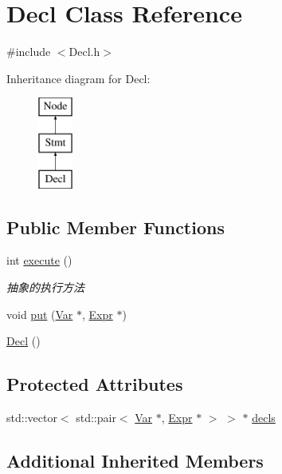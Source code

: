 \hypertarget{class_decl}{}\section{Decl Class Reference}
\label{class_decl}


{\ttfamily \#include $<$Decl.\+h$>$}

Inheritance diagram for Decl\+:\begin{figure}[H]
\begin{center}
\leavevmode
\includegraphics[height=3.000000cm]{class_decl}
\end{center}
\end{figure}
\subsection*{Public Member Functions}
\begin{DoxyCompactItemize}
\item 
int \hyperlink{class_decl_ad6495a4245a45dcdcd05e239c8db4a8b}{execute} ()
\begin{DoxyCompactList}\small\item\em 抽象的执行方法 \end{DoxyCompactList}\item 
void \hyperlink{class_decl_a4c91db9c289b90f3045783f6bf53a688}{put} (\hyperlink{class_var}{Var} $\ast$, \hyperlink{class_expr}{Expr} $\ast$)
\item 
\hyperlink{class_decl_a356b82bee7d66a98c8fbb3547836b785}{Decl} ()
\end{DoxyCompactItemize}
\subsection*{Protected Attributes}
\begin{DoxyCompactItemize}
\item 
std\+::vector$<$ std\+::pair$<$ \hyperlink{class_var}{Var} $\ast$, \hyperlink{class_expr}{Expr} $\ast$ $>$ $>$ $\ast$ \hyperlink{class_decl_a7e84697f4d13126d1234a49b68af7eeb}{decls}
\end{DoxyCompactItemize}
\subsection*{Additional Inherited Members}


